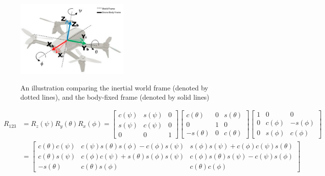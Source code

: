 \documentclass[letterpaper, paper,11pt]{AAS}	%
\begin{document}
\begin{figure}[htb]
	\centering\includegraphics[width=0.5\textwidth]{Figures/DroneFrame}
	\caption{An illustration comparing the inertial world frame (denoted by dotted lines), and the body-fixed frame (denoted by solid lines)}\cite{DroneFrame}
	\label{fig:DroneFrame}
\end{figure}

\begin{equation}
\label{eq:R}
\begin{split}
R_{123} &= R_z(\psi)R_y(\theta)R_x(\phi) = \begin{bmatrix}
c(\psi) & s(\psi) & 0 \\
s(\psi) & c(\psi) & 0 \\
0 & 0 & 1
\end{bmatrix}
\begin{bmatrix}
c(\theta) & 0 & s(\theta) \\
0 & 1 & 0 \\
-s(\theta) & 0 & c(\theta)
\end{bmatrix}
\begin{bmatrix}
1&0&0\\
0&c(\phi)&-s(\phi)\\
0&s(\phi)&c(\phi)
\end{bmatrix}\\
&=
\begin{bmatrix}
c(\theta)c(\psi) & c(\psi)s(\theta)s(\phi) - c(\phi)s(\psi) & s(\phi)s(\psi) + c(\phi)c(\psi)s(\theta) \\
c(\theta)s(\psi) & c(\phi)c(\psi) + s(\theta)s(\phi)s(\psi) & c(\phi)s(\theta)s(\psi) - c(\psi)s(\phi) \\
-s(\theta) & c(\theta)s(\phi) & c(\theta)c(\phi) 
\end{bmatrix}
\end{split}
\end{equation}
\end{document}
